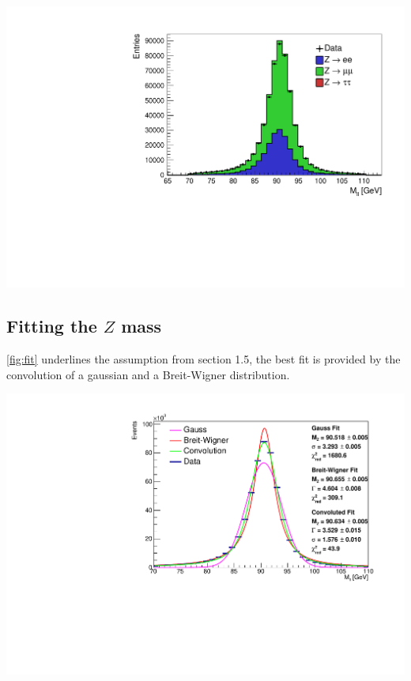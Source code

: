 \documentclass[12pt, a4paper, bibliography=totoc]{scrartcl}
\begin{document}
\begin{multicols}{2}
\begin{center}
	\includegraphics[width=\linewidth]{fig/vergleich_data_mc_final.pdf}
	\label{fig:data_mc}
\end{center}

\subsection{Fitting the $Z$ mass}
\ref{fig:fit} underlines the assumption from section 1.5, the best fit is provided by the convolution of a gaussian and a Breit-Wigner distribution. 

\begin{center}
	\includegraphics[width=\linewidth]{fig/invar_z_mass.pdf}
	\label{fig:fit}
\end{center}


\end{multicols}
\end{document}
